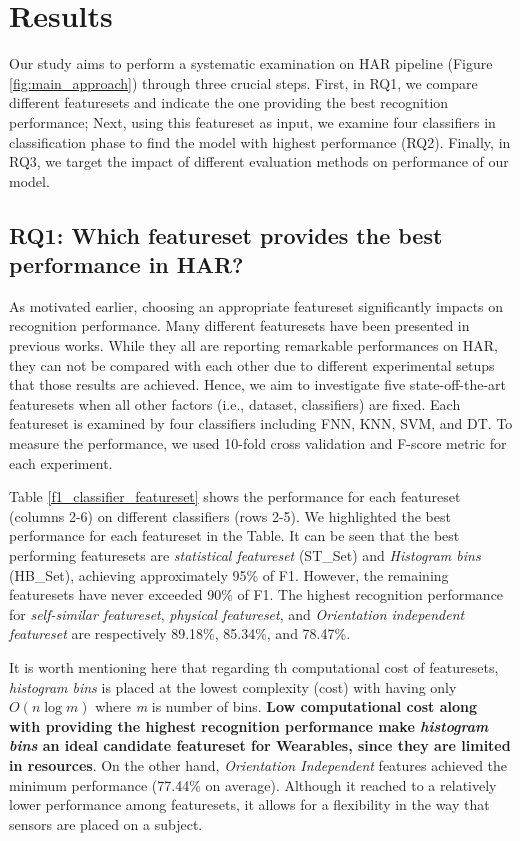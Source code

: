 \documentclass[journal,article,submit,moreauthors,pdftex]{Definitions/mdpi}
\begin{document}
\section{Results}
Our study aims to perform a systematic examination on HAR pipeline (Figure \ref{fig:main_approach}) through three crucial steps. First, in RQ1, we compare different featuresets and indicate the one providing the best recognition performance; Next, using this featureset as input, we examine four classifiers in classification phase to find the model with highest performance (RQ2). Finally, in RQ3,  we target the impact of different evaluation methods on performance of our model.

\subsection{RQ1: Which featureset provides the best performance in HAR?}

As motivated earlier, choosing an appropriate featureset significantly impacts on recognition performance. Many different featuresets have been presented in previous works. While they all are reporting remarkable performances on HAR, they can not be compared with each other due to different experimental setups that those results are achieved. Hence, we aim to investigate five state-off-the-art featuresets when all other factors (i.e., dataset, classifiers) are fixed. Each featureset is examined by four classifiers including FNN, KNN, SVM, and DT. To measure the performance, we used 10-fold cross validation and F-score metric for each experiment.

Table \ref{f1_classifier_featureset} shows the performance for each featureset (columns 2-6) on different classifiers (rows 2-5). We highlighted the best performance for each featureset in the Table. It can be seen that the best performing featuresets are \textit{statistical featureset} (ST\_Set) and \textit{Histogram bins} (HB\_Set), achieving approximately 95\% of F1. However, the remaining featuresets have never exceeded 90\% of F1. The highest recognition performance for \textit{self-similar featureset}, \textit{physical featureset}, and \textit{Orientation independent featureset} are respectively 89.18\%, 85.34\%, and 78.47\%.

It is worth mentioning here that regarding th computational cost of featuresets, \textit{histogram bins} is placed at the lowest complexity (cost) with having only $ O(n\log m) $ where \textit{m} is number of bins. \textbf{Low computational cost along with providing the highest recognition performance make \textit{histogram bins} an ideal candidate featureset for Wearables, since they are limited in resources}. 
On the other hand, \textit{Orientation Independent} features achieved the minimum performance (77.44\% on average). Although it reached to a relatively lower performance among featuresets, it allows for a flexibility in the way that sensors are placed on a subject.
\end{document}
